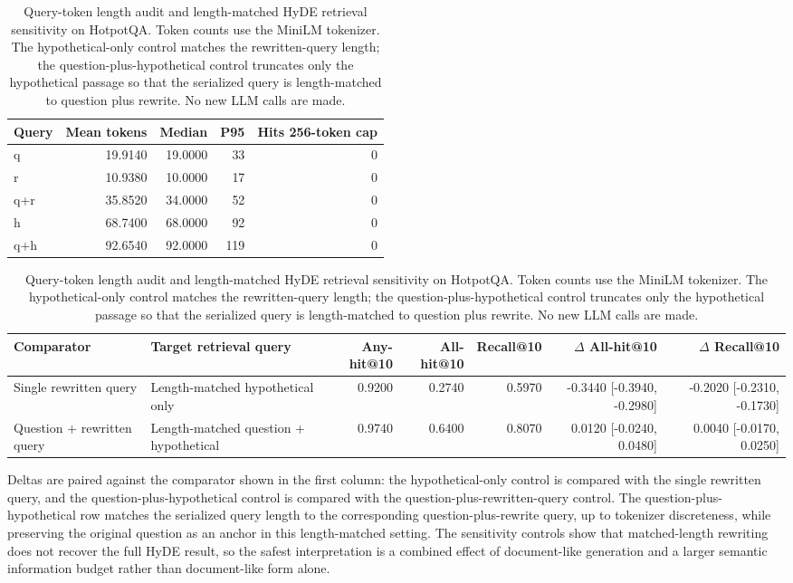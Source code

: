 \begin{table}[t]
\centering
\caption{Query-token length audit and length-matched HyDE retrieval sensitivity on HotpotQA. Token counts use the MiniLM tokenizer. The hypothetical-only control matches the rewritten-query length; the question-plus-hypothetical control truncates only the hypothetical passage so that the serialized query is length-matched to question plus rewrite. No new LLM calls are made.}
\label{tab:query_length_matched_hyde}
\scriptsize
\begin{threeparttable}
\setlength{\tabcolsep}{3pt}
\begin{tabularx}{\textwidth}{>{\raggedright\arraybackslash}Xrrrr}
\toprule
Query & Mean tokens & Median & P95 & Hits 256-token cap \\
\midrule
q & 19.9140 & 19.0000 & 33 & 0 \\
r & 10.9380 & 10.0000 & 17 & 0 \\
q+r & 35.8520 & 34.0000 & 52 & 0 \\
h & 68.7400 & 68.0000 & 92 & 0 \\
q+h & 92.6540 & 92.0000 & 119 & 0 \\
\bottomrule
\end{tabularx}
\vspace{1mm}
\begin{tabularx}{\textwidth}{>{\raggedright\arraybackslash}X>{\raggedright\arraybackslash}Xrrrrr}
\toprule
Comparator & Target retrieval query & Any-hit@10 & All-hit@10 & Recall@10 & $\Delta$ All-hit@10 & $\Delta$ Recall@10 \\
\midrule
Single rewritten query & Length-matched hypothetical only & 0.9200 & 0.2740 & 0.5970 & -0.3440 [-0.3940, -0.2980] & -0.2020 [-0.2310, -0.1730] \\
Question + rewritten query & Length-matched question + hypothetical & 0.9740 & 0.6400 & 0.8070 & 0.0120 [-0.0240, 0.0480] & 0.0040 [-0.0170, 0.0250] \\
\bottomrule
\end{tabularx}
\begin{tablenotes}
\footnotesize
\item Deltas are paired against the comparator shown in the first column: the hypothetical-only control is compared with the single rewritten query, and the question-plus-hypothetical control is compared with the question-plus-rewritten-query control. The question-plus-hypothetical row matches the serialized query length to the corresponding question-plus-rewrite query, up to tokenizer discreteness, while preserving the original question as an anchor in this length-matched setting. The sensitivity controls show that matched-length rewriting does not recover the full HyDE result, so the safest interpretation is a combined effect of document-like generation and a larger semantic information budget rather than document-like form alone.
\end{tablenotes}
\end{threeparttable}
\end{table}
